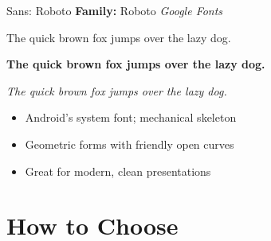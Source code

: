 \documentclass[10pt]{beamer}
\begin{document}
\begin{frame}{Sans: Roboto}
  \textbf{Family:} Roboto \hfill \textit{Google Fonts}

  \vspace{0.3cm}
  {\Large The quick brown fox jumps over the lazy dog.}

  \vspace{0.2cm}
  \textbf{The quick brown fox jumps over the lazy dog.}

  \vspace{0.2cm}
  \textit{The quick brown fox jumps over the lazy dog.}

  \vspace{0.3cm}
  \begin{itemize}
    \item Android's system font; mechanical skeleton
    \item Geometric forms with friendly open curves
    \item Great for modern, clean presentations
  \end{itemize}
\end{frame}

\section{How to Choose}
\end{document}
